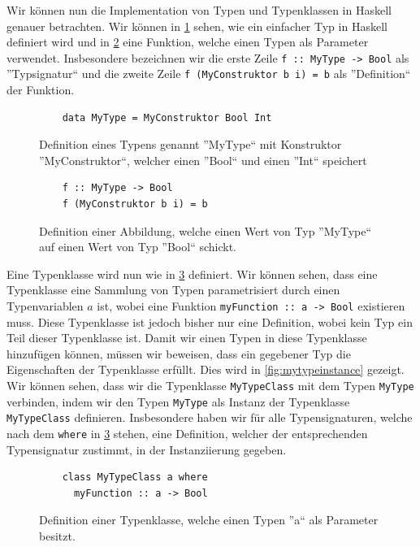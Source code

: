 \documentclass{hhuarticle}
\theoremstyle{definition}
\theoremstyle{theorem}
\begin{document}
  Wir können nun die Implementation von Typen und Typenklassen in Haskell
  genauer betrachten. Wir können in \cref{fig:mytype} sehen, wie ein
  einfacher Typ in Haskell definiert wird und in \cref{fig:myfunction} eine
  Funktion, welche einen Typen als Parameter verwendet. Insbesondere
  bezeichnen wir die erste Zeile \verb|f :: MyType -> Bool| als ''Typsignatur``
  und die zweite Zeile \verb|f (MyConstruktor b i) = b| als ''Definition`` der Funktion.
  
  \begin{figure}[h]
    \begin{lstlisting}
    data MyType = MyConstruktor Bool Int
    \end{lstlisting}
    \caption{Definition eines Typens genannt ''MyType`` mit Konstruktor ''MyConstruktor``, welcher einen ''Bool`` und einen ''Int`` speichert}%
    \label{fig:mytype}
  \end{figure}

  \begin{figure}[h]
    \begin{lstlisting}
    f :: MyType -> Bool
    f (MyConstruktor b i) = b
    \end{lstlisting}
    \caption{Definition einer Abbildung, welche einen Wert von Typ ''MyType`` auf einen Wert von Typ ''Bool`` schickt.}%
    \label{fig:myfunction}
  \end{figure}

  Eine Typenklasse wird nun wie in \cref{fig:mytypeclass} definiert. Wir
  können sehen, dass eine Typenklasse eine Sammlung von Typen
  parametrisiert durch einen Typenvariablen $a$ ist, wobei
  eine Funktion \verb|myFunction :: a -> Bool| existieren muss.
  Diese Typenklasse ist jedoch bisher nur eine Definition, wobei kein
  Typ ein Teil dieser Typenklasse ist. Damit wir einen Typen in diese
  Typenklasse hinzufügen können, müssen wir beweisen, dass ein gegebener
  Typ die Eigenschaften der Typenklasse erfüllt. Dies wird in \cref{fig:mytypeinstance}
  gezeigt. Wir können sehen, dass wir die Typenklasse \verb|MyTypeClass| mit dem Typen
  \verb|MyType| verbinden, indem wir den Typen \verb|MyType| als
  Instanz der Typenklasse \verb|MyTypeClass| definieren.
  Insbesondere haben wir für alle Typensignaturen, welche nach dem \verb|where|
  in \cref{fig:mytypeclass} stehen, eine Definition, welcher der
  entsprechenden Typensignatur zustimmt, in der Instanziierung gegeben.

  \begin{figure}[h]
    \begin{lstlisting}
    class MyTypeClass a where
      myFunction :: a -> Bool
    \end{lstlisting}
    \caption{Definition einer Typenklasse, welche einen Typen ''a`` als Parameter besitzt.}%
    \label{fig:mytypeclass}
  \end{figure}
\end{document}

